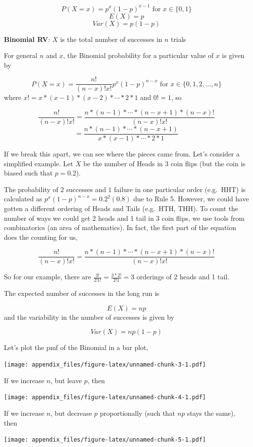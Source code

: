 \documentclass[
]{book}
\begin{document}
\[P(X = x) = p^x (1-p)^{x-1} \text{ for } x\in\{0,1\}\]
\[E(X) = p\]
\[Var(X) = p(1-p) \]

\textbf{Binomial RV}: \(X\) is the total number of successes in \(n\) trials

For general \(n\) and \(x\), the Binomial probability for a particular value of \(x\) is given by

\[P(X = x) =\frac{n!}{(n-x)! x!} p^x (1-p)^{n-x}\text{ for } x\in\{0,1,2,...,n\}\]
where \(x! = x*(x-1)*(x-2)*\cdots*2*1\) and \(0! = 1\), so

\[\frac{n!}{(n-x)! x!} = \frac{n*(n-1)*\cdots*(n-x+1)*(n-x)!}{(n-x)! x!}\]
\[= \frac{n*(n-1)*\cdots*(n-x+1)}{x*(x-1)*\cdots*2*1}\]

If we break this apart, we can see where the pieces came from. Let's consider a simplified example. Let \(X\) be the number of Heads in 3 coin flips (but the coin is biased such that \(p=0.2\)).

The probability of \(2\) successes and \(1\) failure in one particular order (e.g.~HHT) is calculated as \(p^x (1-p)^{n-x} = 0.2^2(0.8)\) due to Rule 5. However, we could have gotten a different ordering of Heads and Tails (e.g.~HTH, THH). To count the number of ways we could get 2 heads and 1 tail in 3 coin flips, we use tools from combinatorics (an area of mathematics). In fact, the first part of the equation does the counting for us,

\[\frac{n!}{(n-x)! x!} = \frac{n*(n-1)*\cdots*(n-x+1)*(n-x)!}{(n-x)! x!}\]

So for our example, there are \(\frac{3!}{2!1!} = \frac{3*2!}{2!1} = 3\) orderings of 2 heads and 1 tail.

The expected number of successes in the long run is

\[E(X) = np\]
and the variability in the number of successes is given by

\[Var(X) = np(1-p) \]

Let's plot the pmf of the Binomial in a bar plot,

\texttt{[image: appendix\_files/figure-latex/unnamed-chunk-3-1.pdf]}

If we increase \(n\), but leave \(p\), then

\texttt{[image: appendix\_files/figure-latex/unnamed-chunk-4-1.pdf]}

If we increase \(n\), but decrease \(p\) proportionally (such that \(np\) stays the same), then

\texttt{[image: appendix\_files/figure-latex/unnamed-chunk-5-1.pdf]}
\end{document}
